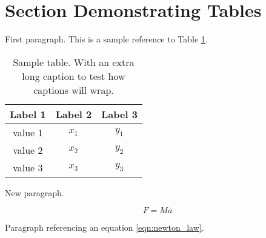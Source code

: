 \section{Section Demonstrating Tables}
First paragraph.  This is a sample reference to Table
\ref{tab:sample}.

\begin{table}
  \centering
  \caption{Sample table. With an extra long caption to test how captions will wrap.}\label{tab:sample}
    \vspace{6pt} %
  \begin{tabular}{c c c}
    \hline
    Label 1 & Label 2 & Label 3 \\
    \hline\hline
    value 1 & $x_1$ & $y_1$ \\
    value 2 & $x_2$ & $y_2$ \\
    value 3 & $x_3$ & $y_3$ \\
    \hline
  \end{tabular}
\end{table}

New paragraph.

\begin{equation}\label{eqn:newton_law}
    F = Ma
\end{equation}

Paragraph referencing an equation \ref{eqn:newton_law}.
